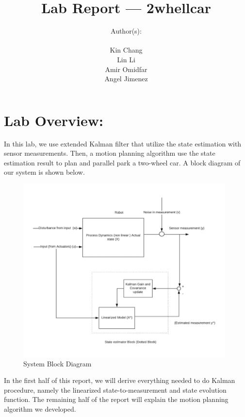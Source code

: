 \documentclass[12pt, letterpaper]{amsart} %
\author{Author(s): \\ \\ Kin Chang \\ 
Lin Li\\Amir Omidfar\\Angel Jimenez}
\title{Lab Report --- 2whellcar}
\numberwithin{equation}{section}
\begin{document}
\maketitle
\pagebreak
\tableofcontents
\pagebreak
\section*{Lab Overview:}
In this lab, we use extended Kalman filter that utilize the state estimation with sensor measurements. Then, a motion planning algorithm use the state estimation result to plan and parallel park a two-wheel car. A block diagram of our system is shown below.


\begin{figure}[h!]
\includegraphics[width=110mm]{./img/fig_1.png}
\caption{System Block Diagram}
\label{fig:figure1}
\end{figure}

In the first half of this report, we will derive everything needed to do Kalman procedure, namely the linearized state-to-measurement and state evolution function. The remaining half of the report will explain the motion planning algorithm we developed.
\\
\newpage
\end{document}
